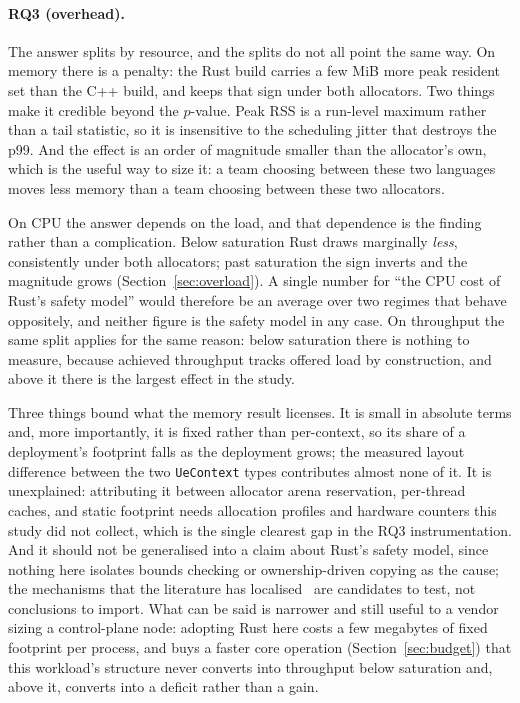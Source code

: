 \documentclass[english,twoside,openright,a4paper,censored,csm,software-track-2020]{HYthesisML}
\begin{document}
\paragraph{RQ3 (overhead).} The answer splits by resource, and the splits do not all point the
same way. On memory there is a penalty: the Rust build carries a few MiB more peak resident set
than the C++ build, and keeps that sign under both allocators. Two things make it credible beyond
the $p$-value. Peak RSS is a run-level maximum rather than a
tail statistic, so it is insensitive to the scheduling jitter that destroys the p99. And the
effect is an order of magnitude smaller than the allocator's own, which is the useful way to size
it: a team choosing between these two languages moves less memory than a team choosing between
these two allocators.

On CPU the answer depends on the load, and that dependence is the finding rather than a
complication. Below saturation Rust draws marginally \emph{less}, consistently under both
allocators; past saturation the sign inverts and the magnitude grows
(Section~\ref{sec:overload}). A single number for ``the CPU cost of
Rust's safety model'' would therefore be an average over two regimes that behave oppositely, and
neither figure is the safety model in any case. On throughput the same split applies for the same
reason: below saturation there is nothing to measure, because achieved throughput tracks offered
load by construction, and above it there is the largest effect in the study.

Three things bound what the memory result licenses. It is small in absolute terms and, more
importantly, it is fixed rather than per-context, so its share of a deployment's footprint
falls as the deployment grows; the measured layout difference between the two
\texttt{UeContext} types contributes almost none of it. It is unexplained: attributing it
between allocator arena reservation, per-thread caches, and static footprint needs allocation
profiles and hardware counters this study did not collect, which is the single clearest gap in
the RQ3 instrumentation. And it should not be generalised into a claim about Rust's safety
model, since nothing here isolates bounds checking or ownership-driven copying as the cause;
the mechanisms that the literature has localised~\cite{zhang2022runtime,harris2023morello}
are candidates to test, not conclusions to import. What can be said is narrower and still
useful to a vendor sizing a control-plane node: adopting Rust here costs a few megabytes of
fixed footprint per process, and buys a faster core operation
(Section~\ref{sec:budget}) that this workload's structure never converts into throughput below
saturation and, above it, converts into a deficit rather than a gain.
\end{document}
